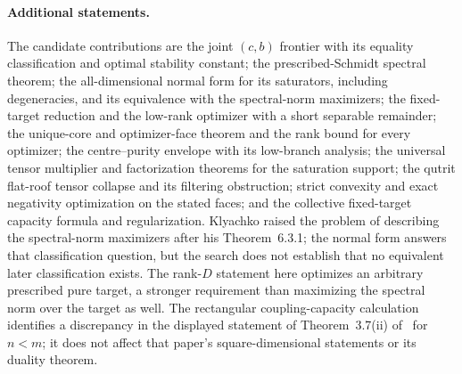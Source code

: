 \documentclass[11pt,a4paper]{article}
\theoremstyle{remark}\newtheorem{remark}[theorem]{Remark}
\begin{document}
\paragraph{Additional statements.}
The candidate contributions are the joint $(c,b)$ frontier with its equality
classification and optimal stability constant; the prescribed-Schmidt
spectral theorem; the all-dimensional normal form for its saturators,
including degeneracies, and its equivalence with the spectral-norm
maximizers; the fixed-target reduction and the low-rank optimizer with a
short separable remainder; the unique-core and optimizer-face theorem and the
rank bound for every optimizer; the centre--purity envelope with its
low-branch analysis; the universal tensor multiplier and factorization
theorems for the saturation support; the qutrit flat-roof tensor collapse
and its filtering obstruction; strict convexity and exact negativity
optimization on the stated faces; and the collective fixed-target capacity
formula and regularization. Klyachko raised the problem of describing the
spectral-norm maximizers after his Theorem~6.3.1; the normal form answers
that classification question, but the search does not establish that no
equivalent later classification exists. The rank-$D$ statement here
optimizes an arbitrary prescribed pure target, a stronger requirement than
maximizing the spectral norm over the target as well. The rectangular
coupling-capacity calculation identifies a discrepancy in the displayed
statement of Theorem~3.7(ii) of~\cite{capacity2025} for $n<m$; it does not
affect that paper's square-dimensional statements or its duality theorem.
\end{document}
